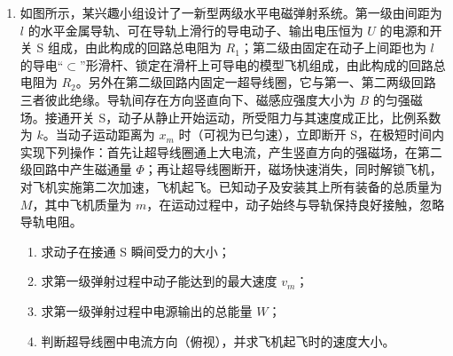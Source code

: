 \documentclass[\gkver]{gaokaozhenti}
\begin{document}
\begin{enumerate}
{解得到达 B 点的速度 $v = 4\Ums$

（2）物块滑上传送带后做加速运动直到与传送带共速，摩擦力对其做的功 $W_{f} = \frac{1}{2}mv_{0}^{2} - \frac{1}{2}mv^{2} = 0.9\UJ$

（3）物块在传送带上加速运动的加速度为 $a = \mu g = 2.5\Umsq$

加速到共速时用时间 $t = \frac{v_{0} - v}{a} = \frac{5 - 4}{2.5}\Us = 0.4\Us$

在传送带上滑动过程中产生的滑痕长度 $\Delta x = v_{0}t - \frac{v_{0} + v}{2}t = 0.2\Um$

（4）从滑块开始进入圆弧槽到到达圆弧槽最高点由水平方向动量守恒和能量关系可知

$mv_{0} = mv_{1} + Mv_{2}$，$\frac{1}{2}mv_{0}^{2} = \frac{1}{2}mv_{1}^{2} + \frac{1}{2}Mv_{2}^{2} + 2mgR$

联立解得 $v_{1} = -2.2\Ums$，$v_{2} = 0.8\Ums$

（另一组 $v_{1} = 3.2\Ums$，$v_{2} = 0.2\Ums$，因不合实际舍掉）

对滑块在最高点时由牛顿第二定律 $F + mg = m\frac{(v_{2} - v_{1})^{2}}{R}$

解得 $F = 3\UN$
}

\item
如图所示，某兴趣小组设计了一新型两级水平电磁弹射系统。第一级由间距为 $l$ 的水平金属导轨、可在导轨上滑行的导电动子、输出电压恒为 $U$ 的电源和开关 S 组成，由此构成的回路总电阻为 $R_{1}$；第二级由固定在动子上间距也为 $l$ 的导电“$\subset$”形滑杆、锁定在滑杆上可导电的模型飞机组成，由此构成的回路总电阻为 $R_{2}$。另外在第二级回路内固定一超导线圈，它与第一、第二两级回路三者彼此绝缘。导轨间存在方向竖直向下、磁感应强度大小为 $B$ 的匀强磁场。接通开关 S，动子从静止开始运动，所受阻力与其速度成正比，比例系数为 $k$。当动子运动距离为 $x_{m}$ 时（可视为已匀速），立即断开 S，在极短时间内实现下列操作：首先让超导线圈通上大电流，产生竖直方向的强磁场，在第二级回路中产生磁通量 $\Phi$；再让超导线圈断开，磁场快速消失，同时解锁飞机，对飞机实施第二次加速，飞机起飞。已知动子及安装其上所有装备的总质量为 $M$，其中飞机质量为 $m$，在运动过程中，动子始终与导轨保持良好接触，忽略导轨电阻。


\begin{enumerate}
	\item
	求动子在接通 S 瞬间受力的大小；
	\item
	求第一级弹射过程中动子能达到的最大速度 $v_{m}$；
	\item
	求第一级弹射过程中电源输出的总能量 $W$；
	\item
	判断超导线圈中电流方向（俯视），并求飞机起飞时的速度大小。
\end{enumerate}


\end{enumerate}
\end{document}

